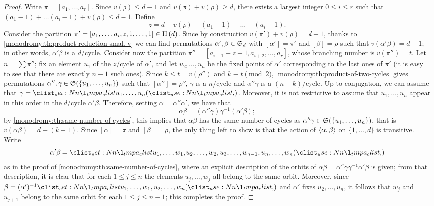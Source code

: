 \begin{proof}
Write $\pi=[a_1,\ldots,a_r]$. Since $v(\rho)\le d-1$ and $v(\pi)+v(\rho)\ge d$, there exists a largest integer $0\le i\le r$ such that $(a_1-1)+\ldots(a_i-1)+v(\rho)\le d-1$. Define
\[
z=d-v(\rho)-(a_1-1)-\ldots-(a_i-1).
\]
Consider the partition $\pi'=[a_1,\ldots,a_i,z,1,\ldots,1]\in\Pi\left(d\right)$. Since by construction $v(\pi')+v(\rho)=d-1$, thanks to \cref{monodromy:th:product-reduction-small-v} we can find permutations $\alpha',\beta\in\symgroup[d]$ with $[\alpha']=\pi'$ and $[\beta]=\rho$ such that $v(\alpha'\beta)=d-1$; in other words, $\alpha'\beta$ is a $d$\=/cycle. Consider now the partition $\pi''=[a_{i+1}-z+1,a_{i+2},\ldots,a_r]$, whose branching number is $v(\pi'')=t$. Let $n=\sum\pi''$; fix an element $u_1$ of the $z$\=/cycle of $\alpha'$, and let $u_2,\ldots,u_n$ be the fixed points of $\alpha'$ corresponding to the last ones of $\pi'$ (it is easy to see that there are exactly $n-1$ such ones). Since $k\le t=v(\rho'')$ and $k\equiv t\pmod{2}$, \cref{monodromy:th:product-of-two-cycles} gives permutations $\alpha'',\gamma\in\symgroup(\{u_1,\ldots,u_n\})$ such that $[\alpha'']=\rho''$, $\gamma$ is a $n$\=/cycle and $\alpha''\gamma$ is a $(n-k)$\=/cycle. Up to conjugation, we can assume that $\gamma=\cycle{u_1,\ldots,u_n}$. Moreover, it is not restrictive to assume that $u_1,\ldots,u_n$ appear in this order in the $d$\=/cycle $\alpha'\beta$. Therefore, setting $\alpha=\alpha''\alpha'$, we have that
\[
\alpha\beta=(\alpha''\gamma)\gamma^{-1}(\alpha'\beta);
\]
by \cref{monodromy:th:same-number-of-cycles}, this implies that $\alpha\beta$ has the same number of cycles as $\alpha''\gamma\in\symgroup(\{u_1,\ldots,u_n\})$, that is $v(\alpha\beta)=d-(k+1)$. Since $[\alpha]=\pi$ and $[\beta]=\rho$, the only thing left to show is that the action of $\left\langle\alpha,\beta\right\rangle$ on $\{1,\ldots,d\}$ is transitive. Write
\[
\alpha'\beta=\cycle{u_1,\ldots,w_1,u_2,\ldots,w_2,u_3,\ldots,w_{n-1},u_n,\ldots,w_n}
\]
as in the proof of \cref{monodromy:th:same-number-of-cycles}, where an explicit description of the orbits of $\alpha\beta=\alpha''\gamma\gamma^{-1}\alpha'\beta$ is given; from that description, it is clear that for each $1\le j\le n$ the elements $u_j,\ldots,w_j$ all belong to the same orbit. Moreover, since $\beta=(\alpha')^{-1}\cycle{u_1,\ldots,w_1,u_2,\ldots,w_n}$ and $\alpha'$ fixes $u_2,\ldots,u_n$, it follows that $w_j$ and $u_{j+1}$ belong to the same orbit for each $1\le j\le n-1$; this completes the proof.
\end{proof}

